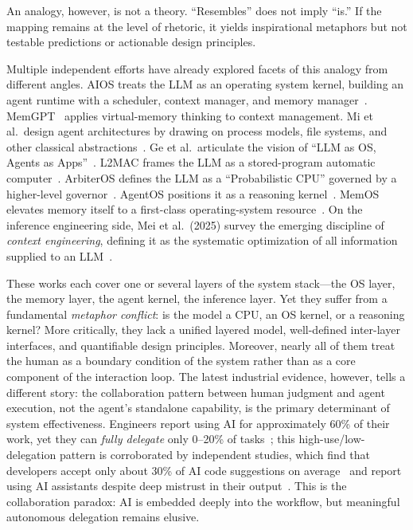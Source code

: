 An analogy, however, is not a theory.
``Resembles'' does not imply ``is.''
If the mapping remains at the level of rhetoric, it yields inspirational metaphors but not testable predictions or actionable design principles.

Multiple independent efforts have already explored facets of this analogy from different angles.
AIOS treats the LLM as an operating system kernel, building an agent runtime with a scheduler, context manager, and memory manager~\cite{mei2024aios}.
MemGPT~\cite{memgpt2023} applies virtual-memory thinking to context management.
Mi et al.\ design agent architectures by drawing on process models, file systems, and other classical abstractions~\cite{mi2025llmagentscomputersystems}.
Ge et al.\ articulate the vision of ``LLM as OS, Agents as Apps''~\cite{ge2023llmos}.
L2MAC frames the LLM as a stored-program automatic computer~\cite{holt2024l2mac}.
ArbiterOS defines the LLM as a ``Probabilistic CPU'' governed by a higher-level governor~\cite{arbiteros2025}.
AgentOS positions it as a reasoning kernel~\cite{agentos2025}.
MemOS elevates memory itself to a first-class operating-system resource~\cite{memos2025}.
On the inference engineering side, Mei et al.\ (2025) survey the emerging discipline of \emph{context engineering}, defining it as the systematic optimization of all information supplied to an LLM~\cite{contextengineer_survey2025}.

These works each cover one or several layers of the system stack---the OS layer, the memory layer, the agent kernel, the inference layer.
Yet they suffer from a fundamental \emph{metaphor conflict}: is the model a CPU, an OS kernel, or a reasoning kernel?
More critically, they lack a unified layered model, well-defined inter-layer interfaces, and quantifiable design principles.
Moreover, nearly all of them treat the human as a boundary condition of the system rather than as a core component of the interaction loop.
The latest industrial evidence, however, tells a different story: the collaboration pattern between human judgment and agent execution, not the agent's standalone capability, is the primary determinant of system effectiveness.
Engineers report using AI for approximately 60\% of their work, yet they can \emph{fully delegate} only 0--20\% of tasks~\cite{anthropic2026agenticreport}; this high-use/low-delegation pattern is corroborated by independent studies, which find that developers accept only about 30\% of AI code suggestions on average~\cite{dohmke2023seachange} and report using AI assistants despite deep mistrust in their output~\cite{klemmer2024aiassistants}.
This is the collaboration paradox: AI is embedded deeply into the workflow, but meaningful autonomous delegation remains elusive.

